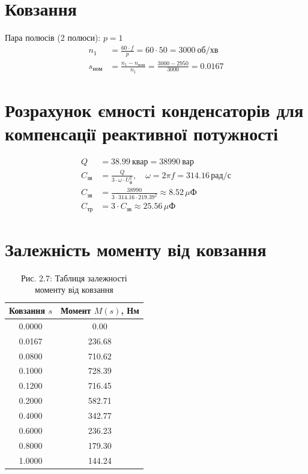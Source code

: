 \documentclass[a4paper]{article}
\begin{document}
\section*{Ковзання}

Пара полюсів (2 полюси): $p = 1$
\begin{align*}
n_1 &= \frac{60 \cdot f}{p} = 60 \cdot 50 = 3000\ \text{об/хв} \\
s_{\text{ном}} &= \frac{n_1 - n_{\text{ном}}}{n_1} = \frac{3000 - 2950}{3000} = 0.0167
\end{align*}

\section*{Розрахунок ємності конденсаторів для компенсації реактивної потужності}

\begin{align*}
Q &= 38.99\ \text{квар} = 38990\ \text{вар} \\
C_{\text{зв}} &= \frac{Q}{3 \cdot \omega \cdot U_{\text{ф}}^2},\quad \omega = 2\pi f = 314.16\,\text{рад/с} \\
C_{\text{зв}} &= \frac{38990}{3 \cdot 314.16 \cdot 219.39^2} \approx 8.52\,\mu\text{Ф} \\
C_{\text{тр}} &= 3 \cdot C_{\text{зв}} \approx 25.56\,\mu\text{Ф}
\end{align*}

\section*{Залежність моменту від ковзання}

\begin{table}[H]
\centering
\caption*{Рис. 2.7: Таблиця залежності моменту від ковзання}
\begin{tabular}{|c|c|}
\hline
\textbf{Ковзання $s$} & \textbf{Момент $M(s)$, Нм} \\
\hline
0.0000 & 0.00 \\
0.0167 & 236.68 \\
0.0800 & 710.62 \\
0.1000 & 728.39 \\
0.1200 & 716.45 \\
0.2000 & 582.71 \\
0.4000 & 342.77 \\
0.6000 & 236.23 \\
0.8000 & 179.30 \\
1.0000 & 144.24 \\
\hline
\end{tabular}
\end{table}
\end{document}
